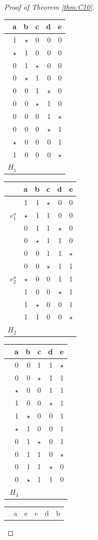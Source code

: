 \documentclass[11pt, a4paper]{article}
\newcommand{\st}{$\mathord{\star}$}
\begin{document}
\begin{proof}[Proof of Theorem \ref{thm:C10}]
\begin{table}
\begin{tabular}{rrrrr|}
 a& b & c& d & e\\
\hline
 1 & \st & 0& 0& 0\\
 \st & 1& 0 & 0& 0\\
0 & 1& \st& 0& 0\\
0 & \st& 1& 0& 0\\
0 & 0  & 1& \st& 0\\
0 & 0& \st & 1 & 0\\
0 & 0& 0 & 1& \st\\
0 & 0& 0& \st & 1\\
\st   & 0& 0& 0& 1\\
1 & 0& 0& 0& \st\\
$H_1$&& &&
\end{tabular}
\hskip 0.2cm
\begin{tabular}{rrrrrr|}
& a& b & c& d & e\\
\hline
& 1 & 1& \st& 0& 0\\
$e_1^a$ & \st & 1& 1& 0& 0\\
&0 & 1& 1& \st& 0\\
&0 & \st& 1& 1& 0\\
&0 & 0&  1& 1& \st\\
&0 & 0& \st & 1 & 1\\
$e_2^a$ &\st & 0& 0 & 1& 1\\
&1 & 0& 0& \st & 1\\
&1  & \st& 0& 0& 1\\
&1 & 1& 0& 0& \st\\
$H_2$ &&&&&
\end{tabular}
\hskip 0.2cm
\begin{tabular}{rrrrr|}
~ a& b & c& d & e\\
\hline
 0& 0&  1& 1& \st\\
 0 & 0& \st & 1& 1\\
\st & 0& 0&  1 & 1\\
1 & 0& 0& \st& 1\\
1 & \st& 0& 0 & 1\\
\st & 1& 0 & 0& 1\\
0 & 1& \st& 0& 1\\
0  & 1& 1& 0 & \st \\
0 & 1& 1& \st& 0\\
0 & \st& 1& 1& 0\\
$H_3$ &&&&
\end{tabular}
\hskip 0.2cm
\begin{tabular}{rrrrr}
~ a & e & c & d & b\\

\end{tabular}
\end{table}
\end{proof}
\end{document}
